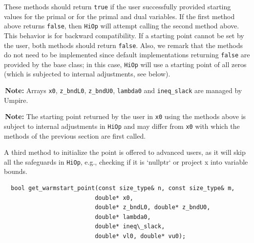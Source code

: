 \documentclass[11pt]{article}
\newcommand{\warningSymbol}{\raisebox{0.9\depth}{\danger}}
\newcommand{\warningcp}[1]{%
        \smallskip \noindent \textcolor{warningColorText}{\warningSymbol{}}\,\textbf{#1} %
    }
\newcommand{\Hi}{\texttt{HiOp}\xspace}
\begin{document}
These methods should return \texttt{true} if the user successfully provided starting values for the primal or for the primal and dual variables. If the first method above returns \texttt{false},  then \Hi will attempt calling the second method above. This behavior is for backward compatibility. If a starting point cannot be set by the user, both methods should return \texttt{false}. Also, we remark that the  methods do not need to be implemented since  default implementations returning \texttt{false} are provided by the base class; in this case, \Hi will use a starting point of all zeros (which is subjected to internal adjustments, see below).

\warningcp{Note:} Arrays \texttt{x0}, \texttt{z\_bndL0}, \texttt{z\_bndU0}, \texttt{lambda0} and \texttt{ineq\_slack} are managed by Umpire.

\warningcp{Note:} The starting point returned by the user in \texttt{x0} using the methods above is subject to internal adjustments in \Hi and may differ from \texttt{x0} with which the methods of the previous section are first called.



A third method to initialize the point is offered to advanced users, as it will skip all the safeguards in \Hi, e.g., checking if it is `nullptr` or project x into variable bounds. 
\begin{lstlisting} 
  bool get_warmstart_point(const size_type& n, const size_type& m,
                          double* x0,
                          double* z_bndL0, double* z_bndU0,
                          double* lambda0,
                          double* ineq\_slack,
                          double* vl0, double* vu0);
  \end{lstlisting} 
\end{document}
